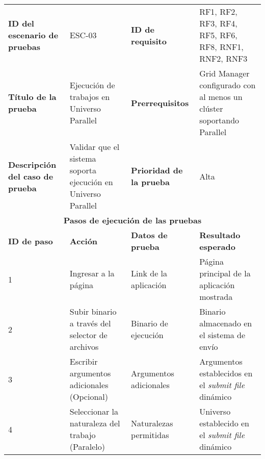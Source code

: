 \begin{table}[H]
	\centering
	\renewcommand{\arraystretch}{1.2} %
	\fontsize{9pt}{10pt}\selectfont %
	\begin{tabular}{|p{2cm}|p{4cm}|p{2.5cm}|p{4.7cm}|} %
		\hline
		\textbf{ID del escenario de pruebas}    & ESC-03                                                        & \textbf{ID de requisito}        & RF1, RF2, RF3, RF4, RF5, RF6, RF8, RNF1, RNF2, RNF3                        \\
		\textbf{Título de la prueba}            & Ejecución de trabajos en Universo Parallel                    & \textbf{Prerrequisitos}         & Grid Manager configurado con al menos un clúster soportando Parallel       \\
		\textbf{Descripción del caso de prueba} & Validar que el sistema soporta ejecución en Universo Parallel & \textbf{Prioridad de la prueba} & Alta                                                                       \\
		\hline
		\multicolumn{4}{|c|}{\textbf{Pasos de ejecución de las pruebas}}                                                                                                                                                       \\
		\hline
		\textbf{ID de paso}                     & \textbf{Acción}                                               & \textbf{Datos de prueba}        & \textbf{Resultado esperado}                                                \\
		\hline
		1                                       & Ingresar a la página                                          & Link de la aplicación           & Página principal de la aplicación mostrada                                 \\
		2                                       & Subir binario a través del selector de archivos               & Binario de ejecución            & Binario almacenado en el sistema de envío                                  \\
		3                                       & Escribir argumentos adicionales (Opcional)                    & Argumentos adicionales          & Argumentos establecidos en el \textit{submit file} dinámico                \\
		4                                       & Seleccionar la naturaleza del trabajo (Paralelo)              & Naturalezas permitidas          & Universo establecido en el \textit{submit file} dinámico                   \\

\end{tabular}
\end{table}
